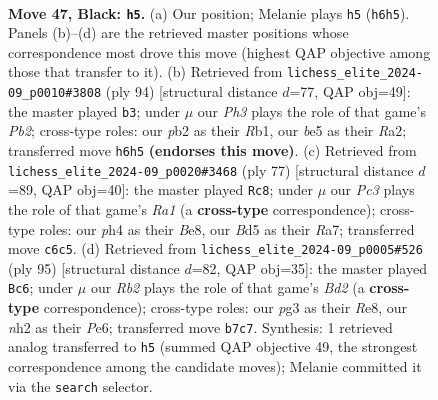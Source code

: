 \documentclass[11pt]{article}
\begin{document}
\clearpage

\begin{figure}[p]\centering
\begin{subfigure}{0.46\textwidth}\centering
\resizebox{\linewidth}{!}{%
\newchessgame
\chessboard[
  setfen={5br1/1r1k2p1/p1p4p/Pp1bBp2/2p4P/4PPP1/1P1K3N/R5R1 b - - 0 47},
  showmover=false,
  pgfstyle=straightmove, color=movearrow, markmove={h6-h5}
]}
\caption{}
\end{subfigure}\hfill
\begin{subfigure}{0.46\textwidth}\centering
\resizebox{\linewidth}{!}{%
\newchessgame
\chessboard[
  setfen={1r6/4kpp1/1r1p4/1bpBpPp1/p3P1P1/2PP2KP/RP6/1R6 w - - 21 48},
  showmover=false,
  pgfstyle=straightmove, color=movearrow, markmove={b2-b3}
]}
\caption{}
\end{subfigure}
\\[4pt]
\begin{subfigure}{0.46\textwidth}\centering
\resizebox{\linewidth}{!}{%
\newchessgame
\chessboard[
  setfen={r3b3/rp3p2/5k2/P2Pbp2/1p5p/1N3PpP/RP4P1/3R1B1K b - - 9 39},
  showmover=false,
  pgfstyle=straightmove, color=movearrow, markmove={a8-c8}
]}
\caption{}
\end{subfigure}\hfill
\begin{subfigure}{0.46\textwidth}\centering
\resizebox{\linewidth}{!}{%
\newchessgame
\chessboard[
  setfen={4r1r1/2kb1p2/4p1p1/1p1pP2p/pP3P2/P1PR2P1/4B2P/2K4R b - - 36 48},
  showmover=false,
  pgfstyle=straightmove, color=movearrow, markmove={d7-c6}
]}
\caption{}
\end{subfigure}
\caption{\textbf{Move 47, Black: \texttt{h5}.} (a) Our position; Melanie plays \texttt{h5} (\texttt{h6h5}). Panels (b)--(d) are the retrieved master positions whose correspondence most drove this move (highest QAP objective among those that transfer to it). (b) Retrieved from \texttt{lichess\_elite\_2024-09\_p0010\#3808} (ply 94) [structural distance $d$=77, QAP obj=49]: the master played \texttt{b3}; under $\mu$ our \emph{Ph3} plays the role of that game's \emph{Pb2}; cross-type roles: our \emph{p}b2 as their \emph{R}b1, our \emph{b}e5 as their \emph{R}a2; transferred move \texttt{h6h5} \textbf{(endorses this move)}. (c) Retrieved from \texttt{lichess\_elite\_2024-09\_p0020\#3468} (ply 77) [structural distance $d$=89, QAP obj=40]: the master played \texttt{Rc8}; under $\mu$ our \emph{Pc3} plays the role of that game's \emph{Ra1} (a \textbf{cross-type} correspondence); cross-type roles: our \emph{p}h4 as their \emph{B}e8, our \emph{B}d5 as their \emph{R}a7; transferred move \texttt{c6c5}. (d) Retrieved from \texttt{lichess\_elite\_2024-09\_p0005\#526} (ply 95) [structural distance $d$=82, QAP obj=35]: the master played \texttt{Bc6}; under $\mu$ our \emph{Rb2} plays the role of that game's \emph{Bd2} (a \textbf{cross-type} correspondence); cross-type roles: our \emph{p}g3 as their \emph{R}e8, our \emph{n}h2 as their \emph{P}e6; transferred move \texttt{b7c7}. Synthesis: 1 retrieved analog transferred to \texttt{h5} (summed QAP objective 49, the strongest correspondence among the candidate moves); Melanie committed it via the \texttt{search} selector.}
\label{fig:thought-m93}
\end{figure}
\end{document}
